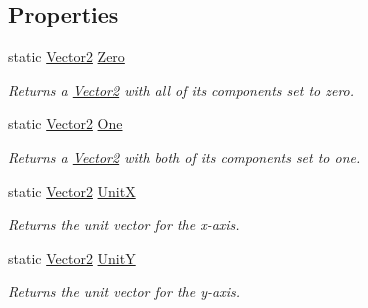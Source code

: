 \subsection*{Properties}
\begin{DoxyCompactItemize}
\item 
static \hyperlink{struct_microsoft_1_1_xna_1_1_framework_1_1_vector2}{Vector2} \hyperlink{struct_microsoft_1_1_xna_1_1_framework_1_1_vector2_a326202f2b3a35f6b549d835dba935f93}{Zero}
\begin{DoxyCompactList}\small\item\em Returns a \hyperlink{struct_microsoft_1_1_xna_1_1_framework_1_1_vector2}{Vector2} with all of its components set to zero.\end{DoxyCompactList}\item 
static \hyperlink{struct_microsoft_1_1_xna_1_1_framework_1_1_vector2}{Vector2} \hyperlink{struct_microsoft_1_1_xna_1_1_framework_1_1_vector2_a81e3bdd813a766ad2a1e14c96c8cfa3b}{One}
\begin{DoxyCompactList}\small\item\em Returns a \hyperlink{struct_microsoft_1_1_xna_1_1_framework_1_1_vector2}{Vector2} with both of its components set to one.\end{DoxyCompactList}\item 
static \hyperlink{struct_microsoft_1_1_xna_1_1_framework_1_1_vector2}{Vector2} \hyperlink{struct_microsoft_1_1_xna_1_1_framework_1_1_vector2_a7884d5af8934eebc91a118a381b0ec25}{Unit\+X}
\begin{DoxyCompactList}\small\item\em Returns the unit vector for the x-\/axis.\end{DoxyCompactList}\item 
static \hyperlink{struct_microsoft_1_1_xna_1_1_framework_1_1_vector2}{Vector2} \hyperlink{struct_microsoft_1_1_xna_1_1_framework_1_1_vector2_ac737216f0343a07a912c3fc34ec64569}{Unit\+Y}
\begin{DoxyCompactList}\small\item\em Returns the unit vector for the y-\/axis.\end{DoxyCompactList}\end{DoxyCompactItemize}


